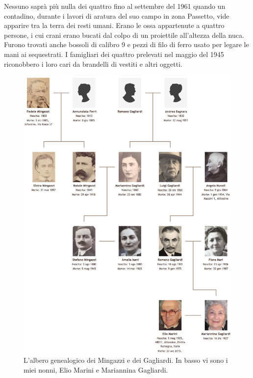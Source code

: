 Nessuno saprà più nulla dei quattro fino al settembre del 1961 quando un contadino, durante i lavori di aratura del suo campo in zona Passetto, vide apparire tra la terra dei resti umani. Erano le ossa appartenute a quattro persone, i cui crani erano bucati dal colpo di un proiettile all'altezza della nuca. Furono trovati anche bossoli di calibro 9 e pezzi di filo di ferro usato per legare le mani ai sequestrati. I famigliari dei quattro prelevati nel maggio del 1945 riconobbero i loro cari da brandelli di vestiti e altri oggetti.

 \begin{figure}[htb]
    \centering
    \includegraphics[width=\textwidth]{albero}
    \caption*{L'albero genealogico dei Mingazzi e dei Gagliardi. In basso vi sono i miei nonni, Elio Marini e Mariannina Gagliardi.}
\end{figure}
